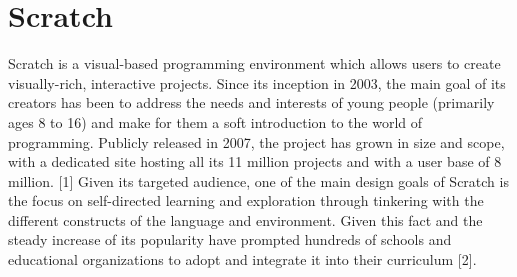 \section{Scratch}
Scratch is a visual-based programming environment which allows users to create visually-rich, interactive projects.  Since its inception in 2003, the main goal of its creators has been to address the needs and interests of young people (primarily ages 8 to 16) and make for them a soft introduction to the world of programming. Publicly released in 2007, the project has grown in size and scope, with a dedicated site hosting all its 11 million projects and with a user base of 8 million. [1]
Given its targeted audience, one of the main design goals of Scratch is the focus on self-directed learning and exploration through tinkering with the different constructs of the language and environment. Given this fact and the steady increase of its popularity have prompted hundreds of schools and educational organizations to adopt and integrate it into their curriculum [2].



